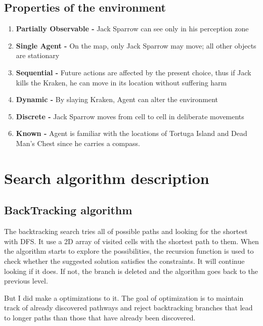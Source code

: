 \documentclass[a4paper,12pt]{article}
\begin{document}
\subsection{Properties of the environment}
\begin{enumerate}
    \item \textbf{Partially Observable -} Jack Sparrow can see only in his perception zone
    \item \textbf{Single Agent -} On the map, only Jack Sparrow may move; all other objects are stationary
    \item \textbf{Sequential -} Future actions are affected by the present choice, thus if Jack kills the Kraken, he can move in its location without suffering harm
    \item \textbf{Dynamic -} By slaying Kraken, Agent can alter the environment
    \item \textbf{Discrete -} Jack Sparrow moves from cell to cell in deliberate movements
    \item \textbf{Known -} Agent is familiar with the locations of Tortuga Island and Dead Man's Chest since he carries a compass.
\end{enumerate}

\section{Search algorithm description}
\subsection{BackTracking algorithm}
The backtracking search tries all of possible paths and looking for the shortest with DFS. It use a 2D array of visited cells with the shortest path to them. When the algorithm starts to explore the possibilities, the recursion function is used to check whether the suggested solution satisfies the constraints. It will continue looking if it does. If not, the branch is deleted and the algorithm goes back to the previous level.

But I did make a optimizations to it. The goal of optimization is to maintain track of already discovered pathways and reject backtracking branches that lead to longer paths than those that have already been discovered. 
\end{document}
